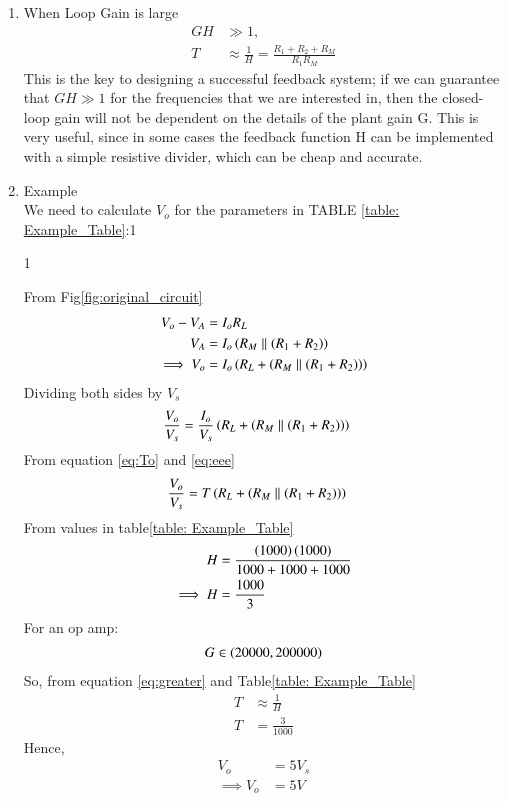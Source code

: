 \begin{enumerate}[label=\thesubsection.\arabic*.,ref=\thesubsection.\theenumi]
\item When Loop Gain is large\\
\solution
\begin{align}
GH &\gg 1, \label{eq:greater}
 \\
T &\approx \frac{1}{H}  = \frac{R_1+R_2+R_M}{R_1R_M} 
\end{align}
This is the key to designing a successful feedback system; if we can guarantee that $GH \gg 1$ for the frequencies that we are interested in, then the closed-loop gain will not be dependent on the details of the plant gain G. This is very useful, since in some cases the feedback function H can be implemented with a simple resistive divider, which can be cheap and accurate.
\item
Example \\ We need to calculate $V_o$ for the parameters in TABLE \ref{table: Example_Table}:1\\
\begin{table}[!ht]
\centering

\caption{1}
\label{table: Example_Table}
\end{table}
\solution
From Fig\ref{fig:original_circuit}
\begin{align}
V_o - V_A &= I_o R_L \\
V_A &= I_o\left(R_M\parallel\left(R_1+R_2\right)\right)\\
\implies V_o &= I_o\left(R_L+\left(R_M\parallel\left(R_1+R_2\right)\right)\right)
\end{align}
Dividing both sides by $V_s$
\begin{align}
\frac{V_o}{V_s} &= \frac{I_o}{V_s}\left(R_L+\left(R_M\parallel\left(R_1+R_2\right)\right)\right) \label{eq:eee}
\end{align}
From equation \ref{eq:To} and \ref{eq:eee}
\begin{align}
 \frac{V_o}{V_s} &= T\left(R_L+\left(R_M\parallel\left(R_1+R_2\right)\right)\right) \label{eq:final}
\end{align}
From values in table\ref{table: Example_Table} 
\begin{align}
 H&= \frac{\left(1000\right)\left(1000\right)}{1000+1000+1000}\\
 \implies H&= \frac{1000}{3}
\end{align}
For an op amp:
\begin{align}
 G \in \left(20000,200000\right)
\end{align}
So, from equation \ref{eq:greater} and Table\ref{table: Example_Table}
\begin{align}
T &\approx \frac{1}{H}\\
 T &= \frac{3}{1000}
\end{align}
Hence,
\begin{align}
V_o &= 5V_s\\
\implies V_o &= 5V
\end{align}
\end{enumerate}
